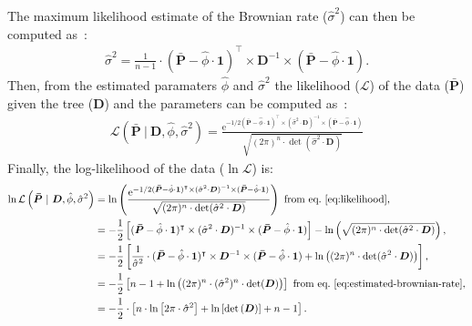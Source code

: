 \documentclass{article}
\newcommand{\Multiply}{\cdot}
\newcommand{\MultiplyMatrix}{\times}
\newcommand{\UniDimArray}[1]{\bm{#1}}
\newcommand{\BiDimArray}[1]{\bm{#1}}
\newcommand{\tr}{^{\intercal}}
\newcommand{\inv}{^{-1}}
\newcommand{\e}{\text{e}}
\newcommand{\Trait}{P}
\newcommand{\NbrTaxa}{n}
\newcommand{\VecTrait}{\UniDimArray{\bar{\Trait}}}
\newcommand{\VecOne}{\UniDimArray{1}}
\newcommand{\Distance}{\BiDimArray{D}}
\newcommand{\DistanceMatrix}{\BiDimArray{\Distance}}
\newcommand{\RateBrownian}{\EstRateBrownian}
\newcommand{\EstRateBrownian}{\hat{\sigma}^2}
\newcommand{\RootTrait}{\phi}
\newcommand{\EstRootTrait}{\hat{\RootTrait}}
\begin{document}
The maximum likelihood estimate of the Brownian rate ($\RateBrownian$) can then be computed as~\citep{omeara_testing_2006}:
\begin{gather}
    \EstRateBrownian = \frac{1}{\NbrTaxa - 1} \Multiply  \left( \VecTrait - \EstRootTrait \Multiply \VecOne \right)\tr \MultiplyMatrix \DistanceMatrix\inv \MultiplyMatrix \left( \VecTrait - \EstRootTrait \Multiply \VecOne \right). \label{eq:estimated-brownian-rate}
\end{gather}
Then, from the estimated paramaters $\EstRootTrait$ and $\EstRateBrownian$ the likelihood ($\mathcal{L}$) of the data ($\VecTrait$) given the tree ($\DistanceMatrix$) and the parameters can be computed as~\citep{omeara_testing_2006, harmon_phylogenetic_2018}:
\begin{gather}
    \mathcal{L} \left(\VecTrait \ | \ \DistanceMatrix, \EstRootTrait, \EstRateBrownian \right) = \frac{\e^{-1/2 (\VecTrait-\EstRootTrait \Multiply \VecOne)\tr \MultiplyMatrix (\EstRateBrownian \Multiply \DistanceMatrix)\inv \MultiplyMatrix (\VecTrait-\EstRootTrait \Multiply \VecOne)}}
{\sqrt{(2 \pi)^\NbrTaxa \Multiply \det (\RateBrownian \Multiply \DistanceMatrix) }} \label{eq:likelihood}
\end{gather}
Finally, the log-likelihood of the data ($\ln \mathcal{L}$) is:
\begin{align}
    \ln \mathcal{L} \left(\VecTrait \ | \ \DistanceMatrix, \EstRootTrait, \EstRateBrownian \right) &= \ln \left( \frac{\e^{-1/2 (\VecTrait-\EstRootTrait \Multiply \VecOne)\tr \MultiplyMatrix (\EstRateBrownian \Multiply \DistanceMatrix)\inv \MultiplyMatrix (\VecTrait-\EstRootTrait \Multiply \VecOne)}}
{\sqrt{(2 \pi)^\NbrTaxa \Multiply \det (\RateBrownian \Multiply \DistanceMatrix) }} \right)\text{ from eq.~\ref{eq:likelihood}}, \\
    &= -\frac{1}{2} \left[ (\VecTrait-\EstRootTrait \Multiply \VecOne)\tr \MultiplyMatrix (\EstRateBrownian \Multiply \DistanceMatrix)\inv \MultiplyMatrix (\VecTrait-\EstRootTrait \Multiply \VecOne) \right] - \ln \left( \sqrt{ (2 \pi)^\NbrTaxa \Multiply \det (\RateBrownian \Multiply \DistanceMatrix) } \right) , \\
    &= -\frac{1}{2} \left[\frac{1}{\EstRateBrownian } \Multiply (\VecTrait-\EstRootTrait \Multiply \VecOne)\tr \MultiplyMatrix  \DistanceMatrix\inv \MultiplyMatrix (\VecTrait-\EstRootTrait \Multiply \VecOne) + \ln \left( (2 \pi)^\NbrTaxa \Multiply \det (\RateBrownian \Multiply \DistanceMatrix)  \right) \right], \\
    &= -\frac{1}{2} \left[\NbrTaxa - 1  + \ln \left( (2 \pi)^\NbrTaxa \Multiply (\RateBrownian)^\NbrTaxa \Multiply \det ( \DistanceMatrix)  \right) \right]\text{ from eq.~\ref{eq:estimated-brownian-rate}}, \\
    &= -\frac{1}{2} \Multiply \left [\NbrTaxa \Multiply \ln \left[2\pi \Multiply \EstRateBrownian\right] + \ln \left[\det \left(\DistanceMatrix\right) \right] + \NbrTaxa - 1 \right]. \label{eq:log-likelihood}
\end{align}
\end{document}
